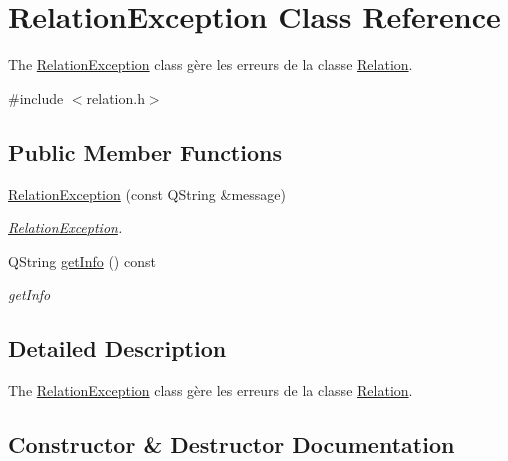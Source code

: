 \hypertarget{class_relation_exception}{}\section{Relation\+Exception Class Reference}
\label{class_relation_exception}


The \hyperlink{class_relation_exception}{Relation\+Exception} class gère les erreurs de la classe \hyperlink{class_relation}{Relation}.  




{\ttfamily \#include $<$relation.\+h$>$}

\subsection*{Public Member Functions}
\begin{DoxyCompactItemize}
\item 
\hyperlink{class_relation_exception_afc142b85d3e744c20e894ac482524ad3}{Relation\+Exception} (const Q\+String \&message)
\begin{DoxyCompactList}\small\item\em \hyperlink{class_relation_exception}{Relation\+Exception}. \end{DoxyCompactList}\item 
Q\+String \hyperlink{class_relation_exception_a3405178340ee7f62a2a38728a4325aab}{get\+Info} () const
\begin{DoxyCompactList}\small\item\em get\+Info \end{DoxyCompactList}\end{DoxyCompactItemize}


\subsection{Detailed Description}
The \hyperlink{class_relation_exception}{Relation\+Exception} class gère les erreurs de la classe \hyperlink{class_relation}{Relation}. 

\subsection{Constructor \& Destructor Documentation}
\mbox{\label{class_relation_exception_afc142b85d3e744c20e894ac482524ad3}} 
